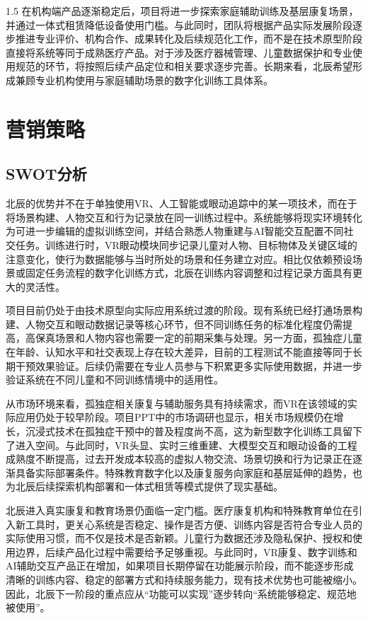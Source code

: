 \documentclass[zihao=-4]{ctexart}
\begin{document}
\begin{spacing}{1.5}
在机构端产品逐渐稳定后，项目将进一步探索家庭辅助训练及基层康复场景，并通过一体式租赁降低设备使用门槛。与此同时，团队将根据产品实际发展阶段逐步推进专业评价、机构合作、成果转化及后续规范化工作，而不是在技术原型阶段直接将系统等同于成熟医疗产品。对于涉及医疗器械管理、儿童数据保护和专业使用规范的环节，将按照后续产品定位和相关要求逐步完善。长期来看，北辰希望形成兼顾专业机构使用与家庭辅助场景的数字化训练工具体系。

\section{营销策略}

\subsection{SWOT分析}

北辰的优势并不在于单独使用VR、人工智能或眼动追踪中的某一项技术，而在于将场景构建、人物交互和行为记录放在同一训练过程中。系统能够将现实环境转化为可进一步编辑的虚拟训练空间，并结合熟悉人物重建与AI智能交互配置不同社交任务。训练进行时，VR眼动模块同步记录儿童对人物、目标物体及关键区域的注意变化，使行为数据能够与当时所处的场景和任务建立对应。相比仅依赖预设场景或固定任务流程的数字化训练方式，北辰在训练内容调整和过程记录方面具有更大的灵活性。

项目目前仍处于由技术原型向实际应用系统过渡的阶段。现有系统已经打通场景构建、人物交互和眼动数据记录等核心环节，但不同训练任务的标准化程度仍需提高，高保真场景和人物内容也需要一定的前期采集与处理。另一方面，孤独症儿童在年龄、认知水平和社交表现上存在较大差异，目前的工程测试不能直接等同于长期干预效果验证。后续仍需要在专业人员参与下积累更多实际使用数据，并进一步验证系统在不同儿童和不同训练情境中的适用性。

从市场环境来看，孤独症相关康复与辅助服务具有持续需求，而VR在该领域的实际应用仍处于较早阶段。项目PPT中的市场调研也显示，相关市场规模仍在增长，沉浸式技术在孤独症干预中的普及程度尚不高，这为新型数字化训练工具留下了进入空间。与此同时，VR头显、实时三维重建、大模型交互和眼动设备的工程成熟度不断提高，过去开发成本较高的虚拟人物交流、场景切换和行为记录正在逐渐具备实际部署条件。特殊教育数字化以及康复服务向家庭和基层延伸的趋势，也为北辰后续探索机构部署和一体式租赁等模式提供了现实基础。

北辰进入真实康复和教育场景仍面临一定门槛。医疗康复机构和特殊教育单位在引入新工具时，更关心系统是否稳定、操作是否方便、训练内容是否符合专业人员的实际使用习惯，而不仅是技术是否新颖。儿童行为数据还涉及隐私保护、授权和使用边界，后续产品化过程中需要给予足够重视。与此同时，VR康复、数字训练和AI辅助交互产品正在增加，如果项目长期停留在功能展示阶段，而不能逐步形成清晰的训练内容、稳定的部署方式和持续服务能力，现有技术优势也可能被缩小。因此，北辰下一阶段的重点应从“功能可以实现”逐步转向“系统能够稳定、规范地被使用”。


\end{spacing}
\end{document}
